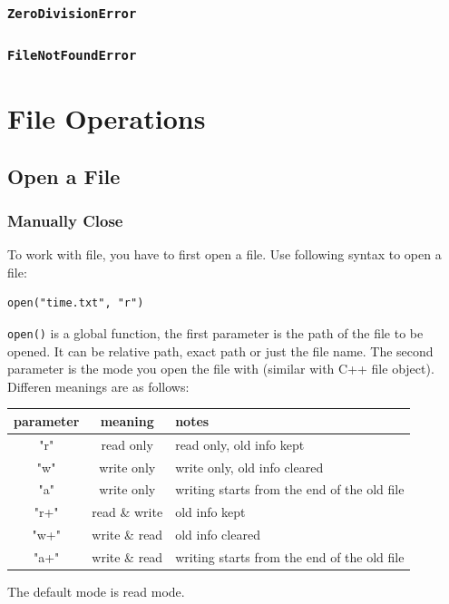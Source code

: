 \documentclass[12pt]{book}
\begin{document}
\subsection{\texttt{ZeroDivisionError}}
\label{sec:orgd2dce34}
\subsection{\texttt{FileNotFoundError}}
\label{sec:org5321dfe}
\chapter{File Operations}
\label{sec:org115fabe}
\section{Open a File}
\label{sec:orgb372b1e}
\subsection{Manually Close}
\label{sec:org302999b}
To work with file, you have to first open a file. Use following syntax to open a file:
\begin{verbatim}
open("time.txt", "r")
\end{verbatim}
\texttt{open()} is a global function, the first parameter is the path of the file to be opened. It can be relative path, exact path or just the file name. The second parameter is the mode you open the file with (similar with C++ file object). Differen meanings are as follows:
\begin{center}
\begin{tabular}{ccl}
parameter & meaning & notes\\
\hline
"r" & read only & read only, old info kept\\
"w" & write only & write only, old info cleared\\
"a" & write only & writing starts from the end of the old file\\
"r+" & read \& write & old info kept\\
"w+" & write \& read & old info cleared\\
"a+" & write \& read & writing starts from the end of the old file\\
\hline
\end{tabular}
\end{center}

The default mode is read mode.
\end{document}

